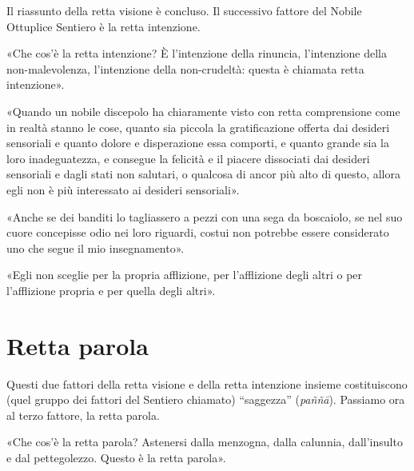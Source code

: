  Il riassunto della retta visione è concluso. Il
successivo fattore del Nobile Ottuplice Sentiero è la retta intenzione.

 «Che cos’è la retta intenzione? È l’intenzione della
rinuncia, l’intenzione della non-malevolenza, l’intenzione della non-crudeltà:
questa è chiamata retta intenzione».


«Quando un nobile discepolo ha chiaramente visto con retta comprensione come in
realtà stanno le cose, quanto sia piccola la gratificazione offerta dai desideri
sensoriali e quanto dolore e disperazione essa comporti, e quanto grande sia la
loro inadeguatezza, e consegue la felicità e il piacere dissociati dai desideri
sensoriali e dagli stati non salutari, o qualcosa di ancor più alto di questo,
allora egli non è più interessato ai desideri sensoriali».


«Anche se dei banditi lo tagliassero a pezzi con una sega da boscaiolo, se nel
suo cuore concepisse odio nei loro riguardi, costui non potrebbe essere
considerato uno che segue il mio insegnamento».


«Egli non sceglie per la propria afflizione, per l’afflizione degli altri o per
l’afflizione propria e per quella degli altri».


\section*{Retta parola}

\label{pag265}%
 Questi due fattori della retta visione e della
retta intenzione insieme costituiscono (quel gruppo dei fattori del Sentiero
chiamato) “saggezza” (\emph{paññā}). Passiamo ora al terzo fattore, la retta
parola.

 «Che cos’è la retta parola? Astenersi dalla menzogna, dalla
calunnia, dall’insulto e dal pettegolezzo. Questo è la retta parola».



